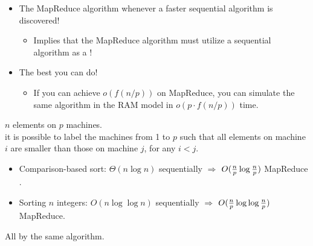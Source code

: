 \documentclass{beamer}
\def\vgap{\vspace{5mm}}
\begin{document}
\begin{frame}
\begin{small}
    
    \vgap 
    
    
    \begin{itemize} 
        \item The MapReduce algorithm  whenever a faster sequential algorithm is discovered!
        \begin{itemize}
            \item Implies that the MapReduce algorithm must utilize a sequential algorithm as a !
        \end{itemize} 
        
        \vgap \pause
        
        \item The best you can do! 
        \begin{itemize}
            \item If you can achieve $o(f(n/p))$ on MapReduce, you can simulate the same algorithm in the RAM model in $o(p \cdot f(n/p))$ time. 
        \end{itemize} 
        
    \end{itemize}

    
\end{small}
\end{frame}
\begin{frame}
\begin{small}
    
    \vgap 
    
     $n$ elements on $p$ machines. \\
     it is possible to label the machines from 1 to $p$ such that all elements on machine $i$ are smaller than those on machine $j$, for any $i < j$. 
    
    
    \vgap \vgap \pause
    
    \begin{tcolorbox}[arc=0mm, colframe=blue!50!black, colback=blue!10!white] 
        \begin{itemize} 
            \item Comparison-based sort: $\Theta(n \log n)$ sequentially $\Rightarrow$ $O(\frac{n}{p} \log \frac{n}{p})$ MapReduce . 
            \item Sorting $n$ integers: $O(n \log\log n)$ sequentially $\Rightarrow$ $O(\frac{n}{p} \log\log \frac{n}{p})$ MapReduce. 
        \end{itemize}
        
        All by the same algorithm. 
    \end{tcolorbox}

    
    
\end{small}
\end{frame}
\end{document}

